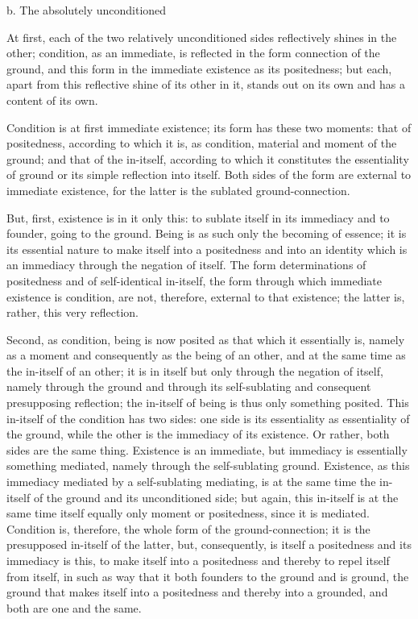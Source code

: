 b. The absolutely unconditioned

At first, each of the two relatively unconditioned sides
reflectively shines in the other;
condition, as an immediate, is reflected
in the form connection of the ground,
and this form in the immediate existence as its positedness;
but each, apart from this reflective shine of its other in it,
stands out on its own and has a content of its own.

Condition is at first immediate existence;
its form has these two moments:
that of positedness, according to which it is, as condition,
material and moment of the ground;
and that of the in-itself, according to which
it constitutes the essentiality of ground
or its simple reflection into itself.
Both sides of the form are external to immediate existence,
for the latter is the sublated ground-connection.

But, first, existence is in it only this:
to sublate itself in its immediacy and to founder, going to the ground.
Being is as such only the becoming of essence;
it is its essential nature to
make itself into a positedness
and into an identity which is
an immediacy through the negation of itself.
The form determinations of positedness and of self-identical in-itself,
the form through which immediate existence is condition,
are not, therefore, external to that existence;
the latter is, rather, this very reflection.

Second, as condition, being is now posited as
that which it essentially is,
namely as a moment and consequently as the being of an other,
and at the same time as the in-itself of an other;
it is in itself but only through the negation of itself,
namely through the ground and through its self-sublating
and consequent presupposing reflection;
the in-itself of being is thus only something posited.
This in-itself of the condition has two sides:
one side is its essentiality as essentiality of the ground,
while the other is the immediacy of its existence.
Or rather, both sides are the same thing.
Existence is an immediate, but immediacy
is essentially something mediated,
namely through the self-sublating ground.
Existence, as this immediacy mediated by a self-sublating mediating,
is at the same time the in-itself of the ground and its unconditioned side;
but again, this in-itself is at the same time itself
equally only moment or positedness, since it is mediated.
Condition is, therefore, the whole form of the ground-connection;
it is the presupposed in-itself of the latter,
but, consequently, is itself a positedness
and its immediacy is this, to make itself into a positedness
and thereby to repel itself from itself,
in such as way that it both founders to the ground and is ground,
the ground that makes itself into a positedness
and thereby into a grounded, and both are one and the same.

